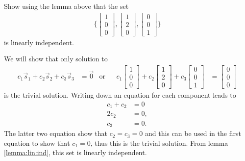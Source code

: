 \begin{example}
Show using the lemma above that the set
%
\begin{align*}
\{ 
\begin{bmatrix}
1 \\ 0 \\ 0
\end{bmatrix}, 
\begin{bmatrix}
1 \\ 2 \\ 0
\end{bmatrix}, 
\begin{bmatrix}
0 \\ 0 \\ 1
\end{bmatrix} \}
\end{align*}
is linearly independent.  

\solution

We will show that only solution to  
%
\begin{align*}
c_1 \vec{s}_1 + c_2 \vec{s}_2 + c_3 \vec{s}_3 & = \vec{0} & \text{or}&& 
c_1 \begin{bmatrix}
1 \\ 0 \\ 0 
\end{bmatrix}+ c_2 \begin{bmatrix}
1 \\2  \\ 0 
\end{bmatrix} + c_3 \begin{bmatrix}
0 \\ 0 \\ 1
\end{bmatrix} & = \begin{bmatrix}
0 \\ 0 \\ 0
\end{bmatrix}
\end{align*}
is the trivial solution. Writing down an equation for each component leads to 
\begin{align*}
c_1 + c_2 & = 0 \\
2 c_2 & = 0, \\
c_3 & = 0.
\end{align*}
The latter two equation show that $c_2=c_3=0$ and this can be used in the first equation to show that $c_1=0$, thus this is the trivial solution.  From lemma \ref{lemma:lin:ind}, this set is linearly independent. 
\end{example}

